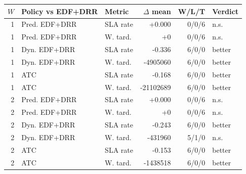 \begin{tabular}{rllrrl}
\toprule
$W$ & Policy vs EDF+DRR & Metric & $\Delta$ mean & W/L/T & Verdict \\
\midrule
1 & Pred. EDF+DRR & SLA rate & +0.000 & 0/0/6 & n.s. \\
1 & Pred. EDF+DRR & W. tard. & +0 & 0/0/6 & n.s. \\
1 & Dyn. EDF+DRR & SLA rate & -0.336 & 6/0/0 & better \\
1 & Dyn. EDF+DRR & W. tard. & -4905060 & 6/0/0 & better \\
1 & ATC & SLA rate & -0.168 & 6/0/0 & better \\
1 & ATC & W. tard. & -21102689 & 6/0/0 & better \\
2 & Pred. EDF+DRR & SLA rate & +0.000 & 0/0/6 & n.s. \\
2 & Pred. EDF+DRR & W. tard. & +0 & 0/0/6 & n.s. \\
2 & Dyn. EDF+DRR & SLA rate & -0.243 & 6/0/0 & better \\
2 & Dyn. EDF+DRR & W. tard. & -431960 & 5/1/0 & n.s. \\
2 & ATC & SLA rate & -0.153 & 6/0/0 & better \\
2 & ATC & W. tard. & -1438518 & 6/0/0 & better \\
\bottomrule
\end{tabular}
